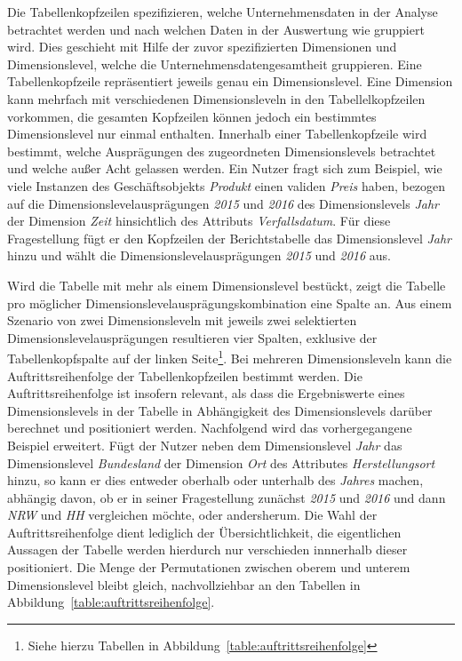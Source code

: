 \documentclass[
  language=german, %
  type=bachelor,%
  ngerman
]{isthesis}
\begin{document}
\begin{content}
  Die Tabellenkopfzeilen spezifizieren, welche Unternehmensdaten in der Analyse
  betrachtet werden und nach welchen Daten in der Auswertung wie gruppiert wird. Dies
  geschieht mit Hilfe der zuvor spezifizierten Dimensionen und Dimensionslevel,
  welche die Unternehmensdatengesamtheit gruppieren. Eine Tabellenkopfzeile
  repräsentiert jeweils genau ein Dimensionslevel. Eine Dimension kann mehrfach
  mit verschiedenen Dimensionsleveln in den Tabellelkopfzeilen vorkommen, die gesamten
  Kopfzeilen können jedoch ein bestimmtes Dimensionslevel nur einmal enthalten.
  Innerhalb einer Tabellenkopfzeile wird bestimmt, welche Ausprägungen des
  zugeordneten Dimensionslevels betrachtet und welche außer Acht gelassen
  werden. Ein Nutzer fragt sich zum Beispiel, wie viele Instanzen des
  Geschäftsobjekts \textit{Produkt} einen validen \textit{Preis} haben, bezogen
  auf die Dimensionslevelausprägungen \textit{2015} und \textit{2016} des
  Dimensionslevels \textit{Jahr} der Dimension \textit{Zeit} hinsichtlich des
  Attributs \textit{Verfallsdatum}. Für diese Fragestellung fügt er den
  Kopfzeilen der Berichtstabelle das Dimensionslevel \textit{Jahr} hinzu und
  wählt die Dimensionslevelausprägungen \textit{2015} und \textit{2016} aus.

  Wird die Tabelle mit mehr als einem Dimensionslevel bestückt, zeigt die
  Tabelle pro möglicher Dimensionslevelausprägungskombination eine Spalte an.
  Aus einem Szenario von zwei Dimensionsleveln mit jeweils zwei selektierten
  Dimensionslevelausprägungen resultieren vier Spalten, exklusive der
  Tabellenkopfspalte auf der linken Seite\footnote{Siehe hierzu Tabellen in
  Abbildung~\ref{table:auftrittsreihenfolge}}. Bei mehreren Dimensionsleveln
  kann die Auftrittsreihenfolge der Tabellenkopfzeilen bestimmt werden. Die
  Auftrittsreihenfolge ist insofern relevant, als dass die Ergebniswerte eines
  Dimensionslevels in der Tabelle in Abhängigkeit des Dimensionslevels darüber
  berechnet und positioniert werden. Nachfolgend wird das vorhergegangene
  Beispiel erweitert. Fügt der Nutzer neben dem Dimensionslevel \textit{Jahr}
  das Dimensionslevel \textit{Bundesland} der Dimension \textit{Ort} des
  Attributes \textit{Herstellungsort} hinzu, so kann er dies entweder oberhalb oder
  unterhalb des \textit{Jahres} machen, abhängig davon, ob er in seiner
  Fragestellung zunächst \textit{2015} und \textit{2016} und dann \textit{NRW}
  und \textit{HH} vergleichen möchte, oder andersherum. Die Wahl der
  Auftrittsreihenfolge dient lediglich der Übersichtlichkeit, die eigentlichen
  Aussagen der Tabelle werden hierdurch nur verschieden innnerhalb dieser positioniert.
  Die Menge der Permutationen zwischen oberem und unterem Dimensionslevel
  bleibt gleich, nachvollziehbar an den Tabellen in
  Abbildung~\ref{table:auftrittsreihenfolge}.
  

\end{content}
\end{document}
